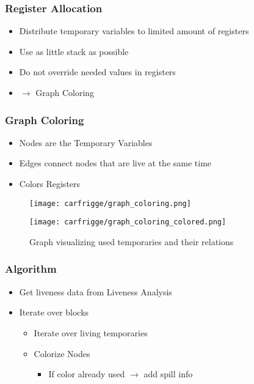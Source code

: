 \begin{frame}
  \frametitle{Register Allocation}
  \begin{itemize}
    \item Distribute temporary variables to limited amount of registers
    \item Use as little stack as possible
    \item Do not override needed values in registers
    \item $\rightarrow$ Graph Coloring
  \end{itemize}
\end{frame}

\begin{frame}
  \frametitle{Graph Coloring}
  \begin{itemize}
    \item Nodes are the Temporary Variables
    \item Edges connect nodes that are live at the same time
    \item Colors Registers
  \end{itemize}
  \begin{figure}
  \texttt{[image: carfrigge/graph\_coloring.png]}
  \end{figure}
\end{frame}

\begin{frame}
  \begin{figure}
  \texttt{[image: carfrigge/graph\_coloring\_colored.png]}
  \caption{\small Graph visualizing used temporaries and their relations}
  \end{figure}
\end{frame}

\begin{frame}
    \frametitle{Algorithm}
    \begin{itemize}
       \item Get liveness data from Liveness Analysis
       \item Iterate over blocks
         \begin{itemize}
           \item Iterate over living temporaries
           \item Colorize Nodes
            \begin{itemize}
                \item If color already used $\rightarrow$ add spill info
            \end{itemize}
         \end{itemize}
    \end{itemize}
\end{frame}

